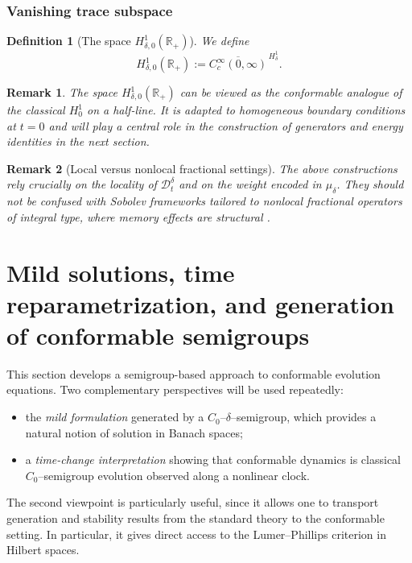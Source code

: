 \documentclass[preprint,12pt]{elsarticle}
\newtheorem{definition}{Definition}
\newtheorem{remark}{Remark}
\newcommand{\R}{\mathbb {R}}
\begin{document}
\subsubsection*{Vanishing trace subspace}

\begin{definition}[The space $H_{\delta,0}^1(\R_+)$]\label{def:H10delta}
We define
\[
H_{\delta,0}^1(\R_+)
:=
\overline{C_c^\infty(0,\infty)}^{\,H_\delta^1}.
\]
\end{definition}

\begin{remark}\label{rem:H10_role}
The space $H_{\delta,0}^1(\R_+)$ can be viewed as the conformable analogue of the
classical $H_0^1$ on a half-line.
It is adapted to homogeneous boundary conditions at $t=0$ and will play a central
role in the construction of generators and energy identities in the next section.
\end{remark}

\begin{remark}[Local versus nonlocal fractional settings]\label{rem:local_vs_nonlocal}
The above constructions rely crucially on the locality of $\mathcal D_t^\delta$ and
on the weight encoded in $\mu_\delta$.
They should not be confused with Sobolev frameworks tailored to nonlocal fractional
operators of integral type, where memory effects are structural
\cite{kilbas2006,mainardi2010,tarasov2018}.
\end{remark}

\section{Mild solutions, time reparametrization, and generation of conformable semigroups}
\label{sec:mild-lumer}

This section develops a semigroup-based approach to conformable evolution
equations.
Two complementary perspectives will be used repeatedly:
\begin{itemize}
\item[(i)] the \emph{mild formulation} generated by a $C_0$--$\delta$--semigroup,
which provides a natural notion of solution in Banach spaces;
\item[(ii)] a \emph{time-change interpretation} showing that conformable dynamics
is classical $C_0$--semigroup evolution observed along a nonlinear clock.
\end{itemize}
The second viewpoint is particularly useful, since it allows one to transport
generation and stability results from the standard theory to the conformable
setting. In particular, it gives direct access to the Lumer--Phillips criterion
in Hilbert spaces.
\end{document}
